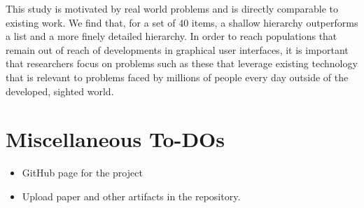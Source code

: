 \documentclass{sigchi}
\begin{document}
This study is motivated by real world problems and is directly comparable to existing work. We find that, for a set of 40 items, a shallow hierarchy outperforms a list and a more finely detailed hierarchy. In order to reach populations that remain out of reach of developments in graphical user interfaces, it is important that researchers focus on problems such as these that leverage existing technology that is relevant to problems faced by millions of people every day outside of the developed, sighted world.

\section{Miscellaneous To-DOs}
\begin{itemize}
\item GitHub page for the project
\item Upload paper and other artifacts in the repository. 
\end{itemize}





%
%
%
%
%
\balance



\end{document}
